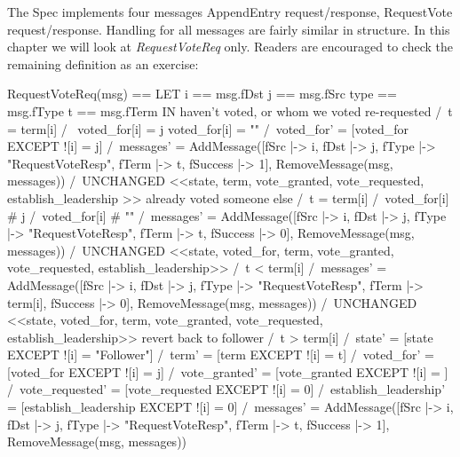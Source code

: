 The Spec implements four messages AppendEntry request/response, RequestVote
request/response. Handling for all messages are fairly similar in structure. In
this chapter we will look at \textit{RequestVoteReq} only. Readers are
encouraged to check the remaining definition as an exercise:\newline

\begin{tla}
RequestVoteReq(msg) == 
    LET 
        i == msg.fDst
        j == msg.fSrc
        type == msg.fType
        t == msg.fTerm
    IN 
        \* haven't voted, or whom we voted re-requested
        \/ /\ t = term[i]
           /\ \/ voted_for[i] = j 
              \/ voted_for[i] = ""
           /\ voted_for' = [voted_for EXCEPT ![i] = j]
           /\ messages' = AddMessage([fSrc |-> i, 
                                        fDst |-> j, 
                                        fType |-> "RequestVoteResp",
                                        fTerm |-> t, 
                                        fSuccess |-> 1],
                                        RemoveMessage(msg, messages))
           /\ UNCHANGED <<state, term, vote_granted, vote_requested, establish_leadership >>
        \* already voted someone else
        \/ /\ t = term[i]
           /\ voted_for[i] # j 
           /\ voted_for[i] # ""
           /\ messages' = AddMessage([fSrc |-> i, 
                                        fDst |-> j, 
                                        fType |-> "RequestVoteResp",
                                        fTerm |-> t, 
                                        fSuccess |-> 0],
                                        RemoveMessage(msg, messages))
            /\ UNCHANGED <<state, voted_for, term, vote_granted, vote_requested, establish_leadership>>
        \/  /\ t < term[i]
            /\ messages' = AddMessage([fSrc |-> i, 
                                        fDst |-> j, 
                                        fType |-> "RequestVoteResp",
                                        fTerm |-> term[i], 
                                        fSuccess |-> 0],
                                        RemoveMessage(msg, messages))
            /\ UNCHANGED <<state, voted_for, term, vote_granted, vote_requested, establish_leadership>>
        \* revert back to follower
        \/  /\ t > term[i]
            /\ state' = [state EXCEPT ![i] = "Follower"]
            /\ term' = [term EXCEPT ![i] = t]
            /\ voted_for' = [voted_for EXCEPT ![i] = j]
            /\ vote_granted' = [vote_granted EXCEPT ![i] = {}]
            /\ vote_requested' = [vote_requested EXCEPT ![i] = 0]
            /\ establish_leadership' = [establish_leadership EXCEPT ![i] = 0]
            /\ messages' = AddMessage([fSrc |-> i, 
                                        fDst |-> j, 
                                        fType |-> "RequestVoteResp",
                                        fTerm |-> t, 
                                        fSuccess |-> 1],
                                        RemoveMessage(msg, messages))
\end{tla}
